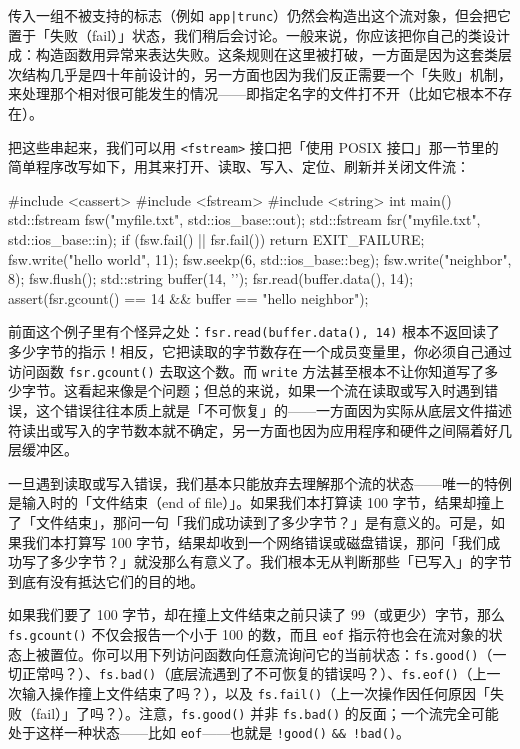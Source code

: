 传入一组不被支持的标志（例如 \texttt{app|trunc}）仍然会构造出这个流对象，但会把它置于「失败（fail）」状态，我们稍后会讨论。一般来说，你应该把你自己的类设计成：构造函数用异常来表达失败。这条规则在这里被打破，一方面是因为这套类层次结构几乎是四十年前设计的，另一方面也因为我们反正需要一个「失败」机制，来处理那个相对很可能发生的情况——即指定名字的文件打不开（比如它根本不存在）。

把这些串起来，我们可以用 \texttt{<fstream>\allowbreak{}} 接口把「使用 POSIX 接口」那一节里的简单程序改写如下，用其来打开、读取、写入、定位、刷新并关闭文件流：

\begin{codebox}[cpp]
    #include <cassert>
    #include <fstream>
    #include <string>
    int main()
    {
      std::fstream fsw("myfile.txt", std::ios_base::out);
      std::fstream fsr("myfile.txt", std::ios_base::in);
      if (fsw.fail() || fsr.fail())
        return EXIT_FAILURE;
      fsw.write("hello world", 11);
      fsw.seekp(6, std::ios_base::beg);
      fsw.write("neighbor", 8);
      fsw.flush();
      std::string buffer(14, '\0');
      fsr.read(buffer.data(), 14);
      assert(fsr.gcount() == 14 && buffer == "hello neighbor");
    }
\end{codebox}

前面这个例子里有个怪异之处：\texttt{fsr.\allowbreak{}read(\allowbreak{}buffer.\allowbreak{}data(\allowbreak{})\allowbreak{},\allowbreak{} 14)\allowbreak{}} 根本不返回读了多少字节的指示！相反，它把读取的字节数存在一个成员变量里，你必须自己通过访问函数 \texttt{fsr.\allowbreak{}gcount(\allowbreak{})\allowbreak{}} 去取这个数。而 \texttt{write} 方法甚至根本不让你知道写了多少字节。这看起来像是个问题；但总的来说，如果一个流在读取或写入时遇到错误，这个错误往往本质上就是「不可恢复」的——一方面因为实际从底层文件描述符读出或写入的字节数本就不确定，另一方面也因为应用程序和硬件之间隔着好几层缓冲区。

一旦遇到读取或写入错误，我们基本只能放弃去理解那个流的状态——唯一的特例是输入时的「文件结束（end of file）」。如果我们本打算读 100 字节，结果却撞上了「文件结束」，那问一句「我们成功读到了多少字节？」是有意义的。可是，如果我们本打算写 100 字节，结果却收到一个网络错误或磁盘错误，那问「我们成功写了多少字节？」就没那么有意义了。我们根本无从判断那些「已写入」的字节到底有没有抵达它们的目的地。

如果我们要了 100 字节，却在撞上文件结束之前只读了 99（或更少）字节，那么 \texttt{fs.\allowbreak{}gcount(\allowbreak{})\allowbreak{}} 不仅会报告一个小于 100 的数，而且 \texttt{eof} 指示符也会在流对象的状态上被置位。你可以用下列访问函数向任意流询问它的当前状态：\texttt{fs.\allowbreak{}good(\allowbreak{})\allowbreak{}}（一切正常吗？）、\texttt{fs.\allowbreak{}bad(\allowbreak{})\allowbreak{}}（底层流遇到了不可恢复的错误吗？）、\texttt{fs.\allowbreak{}eof(\allowbreak{})\allowbreak{}}（上一次输入操作撞上文件结束了吗？），以及 \texttt{fs.\allowbreak{}fail(\allowbreak{})\allowbreak{}}（上一次操作因任何原因「失败（fail）」了吗？）。注意，\texttt{fs.\allowbreak{}good(\allowbreak{})\allowbreak{}} 并非 \texttt{fs.\allowbreak{}bad(\allowbreak{})\allowbreak{}} 的反面；一个流完全可能处于这样一种状态——比如 \texttt{eof}——也就是 \texttt{!good(\allowbreak{})\allowbreak{}} \texttt{\&\& !bad(\allowbreak{})\allowbreak{}}。

